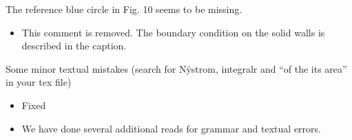 \documentclass[11pt]{article}
\newcommand{\comment}[1]{{\color{blue} #1}}
\begin{document}
\comment{The reference blue circle in Fig. 10 seems to be missing.}
\begin{itemize}
  \item This comment is removed.  The boundary condition on the solid
  walls is described in the caption. 
\end{itemize}

\comment{Some minor textual mistakes (search for N\"{y}strom,  integralr
and ``of the its area'' in your tex file)}
\begin{itemize}
  \item Fixed

  \item We have done several additional reads for grammar and textual
  errors.
\end{itemize}
\end{document}

